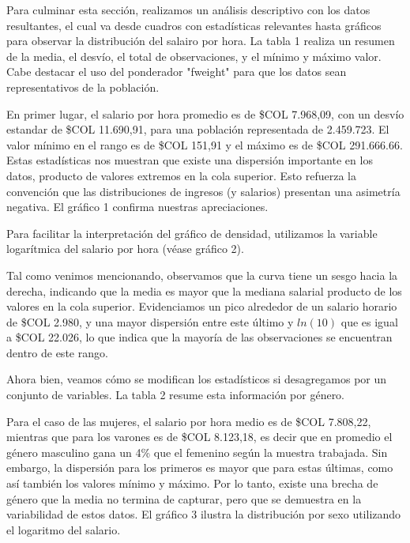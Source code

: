 \documentclass[11pt,oneside]{article}
\begin{document}
	Para culminar esta sección, realizamos un análisis descriptivo con los datos resultantes, el cual va desde cuadros con estadísticas relevantes hasta gráficos para observar la distribución del salairo por hora. La tabla 1 realiza un resumen de la media, el desvío, el total de observaciones, y el mínimo y máximo valor. Cabe destacar el uso del ponderador "fweight" para que los datos sean representativos de la población.
	
	
	En primer lugar, el salario por hora promedio es de \$COL 7.968,09, con un desvío estandar de \$COL 11.690,91, para una población representada de 2.459.723. El valor mínimo en el rango es de \$COL 151,91 y el máximo es de \$COL 291.666.66. Estas estadísticas nos muestran que existe una dispersión importante en los datos, producto de valores extremos en la cola superior. Esto refuerza la convención que las distribuciones de ingresos (y salarios) presentan una asimetría negativa. El gráfico 1 confirma nuestras apreciaciones.
	
	
	Para facilitar la interpretación del gráfico de densidad, utilizamos la variable logarítmica del salario por hora (véase gráfico 2).
	
	
	Tal como venimos mencionando, observamos que la curva tiene un sesgo hacia la derecha, indicando que la media es mayor que la mediana salarial producto de los valores en la cola superior. Evidenciamos un pico alrededor de un salario horario de \$COL 2.980, y una mayor dispersión entre este último y $ln(10)$ que es igual a \$COL 22.026, lo que indica que la mayoría de las observaciones se encuentran dentro de este rango. 
	
	Ahora bien, veamos cómo se modifican los estadísticos si desagregamos por un conjunto de variables. La tabla 2 resume esta información por género. 
	
	
	Para el caso de las mujeres, el salario por hora medio es de \$COL 7.808,22, mientras que para los varones es de \$COL 8.123,18, es decir que en promedio el género masculino gana un 4\% que el femenino según la muestra trabajada. Sin embargo, la dispersión para los primeros es mayor que para estas últimas, como así también los valores mínimo y máximo. Por lo tanto, existe una brecha de género que la media no termina de capturar, pero que se demuestra en la variabilidad de estos datos. El gráfico 3 ilustra la distribución por sexo utilizando el logaritmo del salario. 
	
\end{document}
